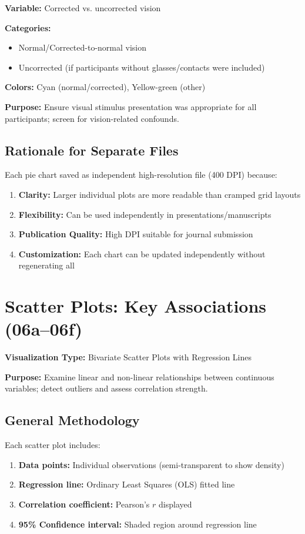 \documentclass[12pt,a4paper]{article}
\begin{document}
\textbf{Variable:} Corrected vs. uncorrected vision

\textbf{Categories:}
\begin{itemize}
    \item Normal/Corrected-to-normal vision
    \item Uncorrected (if participants without glasses/contacts were included)
\end{itemize}

\textbf{Colors:} Cyan (normal/corrected), Yellow-green (other)

\textbf{Purpose:} Ensure visual stimulus presentation was appropriate for all participants; screen for vision-related confounds.

\subsection{Rationale for Separate Files}

Each pie chart saved as independent high-resolution file (400 DPI) because:
\begin{enumerate}
    \item \textbf{Clarity:} Larger individual plots are more readable than cramped grid layouts
    \item \textbf{Flexibility:} Can be used independently in presentations/manuscripts
    \item \textbf{Publication Quality:} High DPI suitable for journal submission
    \item \textbf{Customization:} Each chart can be updated independently without regenerating all
\end{enumerate}

\newpage
\section{Scatter Plots: Key Associations (06a--06f)}

\textbf{Visualization Type:} Bivariate Scatter Plots with Regression Lines

\textbf{Purpose:} Examine linear and non-linear relationships between continuous variables; detect outliers and assess correlation strength.

\subsection{General Methodology}

Each scatter plot includes:
\begin{enumerate}
    \item \textbf{Data points:} Individual observations (semi-transparent to show density)
    \item \textbf{Regression line:} Ordinary Least Squares (OLS) fitted line
    \item \textbf{Correlation coefficient:} Pearson's $r$ displayed
    \item \textbf{95\% Confidence interval:} Shaded region around regression line
\end{enumerate}
\end{document}
